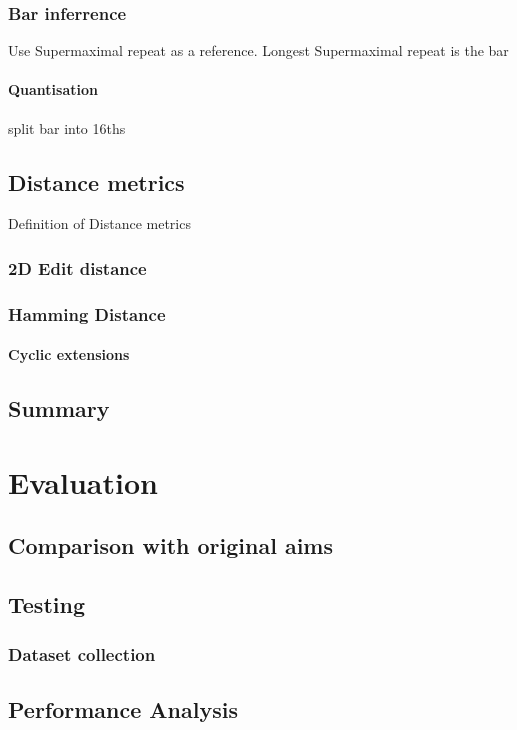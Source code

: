 \documentclass[12pt,twoside,notitlepage]{report}
\begin{document}
		\subsection{Bar inferrence}
		Use Supermaximal repeat as a reference.
		Longest Supermaximal repeat is the bar
			\subsubsection{Quantisation}
			split bar into 16ths
	\section{Distance metrics}
	Definition of Distance metrics
		\subsection{2D Edit distance}
		
		\subsection{Hamming Distance}
		
		\subsubsection{Cyclic extensions}
			
	\section{Summary}
	

\cleardoublepage
\chapter{Evaluation}
	\section{Comparison with original aims}
	\section{Testing}
		\subsection{Dataset collection}
	\section{Performance Analysis}
\end{document}
